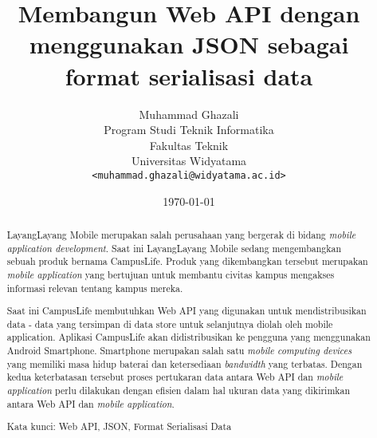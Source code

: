 \documentclass[a4paper, 12pt]{report}
\title{\textbf{Membangun Web API dengan menggunakan JSON sebagai format serialisasi data}}
\author{
Muhammad Ghazali\\
Program Studi Teknik Informatika\\
Fakultas Teknik\\
Universitas Widyatama
\\\texttt{<muhammad.ghazali@widyatama.ac.id>}
}
\date{\today}
\begin{document}
\maketitle

\onehalfspacing
\tableofcontents
\setcounter{tocdepth}{3}

\begin{abstract}
\onehalfspacing LayangLayang Mobile merupakan salah perusahaan yang bergerak di bidang \textit{mobile application development}. Saat ini LayangLayang Mobile sedang mengembangkan sebuah produk bernama CampusLife. Produk yang dikembangkan tersebut merupakan \textit{mobile application} yang bertujuan untuk membantu civitas kampus mengakses informasi relevan tentang kampus mereka.

\onehalfspacing Saat ini CampusLife membutuhkan Web API yang digunakan untuk mendistribusikan data - data yang tersimpan di data store untuk selanjutnya diolah oleh mobile application. Aplikasi CampusLife akan didistribusikan ke pengguna yang menggunakan Android Smartphone. {Smartphone} merupakan salah satu \textit{mobile computing devices} yang memiliki masa hidup baterai dan ketersediaan \textit{bandwidth} yang terbatas. Dengan kedua keterbatasan tersebut proses pertukaran data antara Web API dan \textit{mobile application} perlu dilakukan dengan efisien dalam hal ukuran data yang dikirimkan antara Web API dan \textit{mobile application}.

\begin{flushleft}
\onehalfspacing Kata kunci: Web API, JSON, Format Serialisasi Data
\end{flushleft}

\end{abstract}

\end{document}
